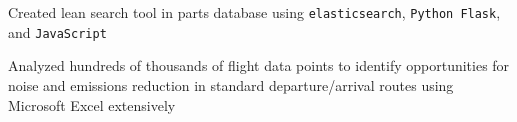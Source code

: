 \documentclass[]{deedy-resume-openfont}
\begin{document}




\sectionsep




\begin{tightemize}
\item Created lean search tool in parts database using \verb|elasticsearch|, \verb|Python Flask|, and \verb|JavaScript|
\end{tightemize}
\sectionsep


\begin{tightemize}
\item Analyzed hundreds of thousands of flight data points to identify opportunities for noise and emissions reduction in standard departure/arrival routes using Microsoft Excel extensively
\end{tightemize}
\end{document}
